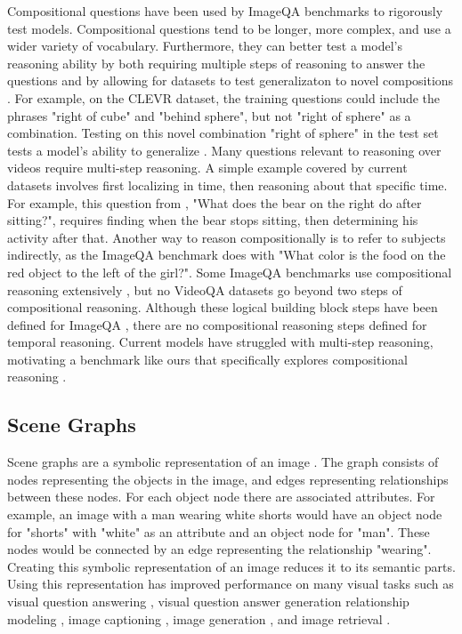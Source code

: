 \documentclass[10pt,twocolumn,letterpaper]{article}
\begin{document}
Compositional questions have been used by ImageQA benchmarks to rigorously test models. Compositional questions tend to be longer, more complex, and use a wider variety of vocabulary. Furthermore, they can better test a model's reasoning ability by both requiring multiple steps of reasoning to answer the questions and by allowing for datasets to test generalizaton to novel compositions \cite{johnson2017clevr, hudson2019gqa}. For example, on the CLEVR dataset, the training questions could include the phrases "right of cube" and "behind sphere", but not "right of sphere" as a combination. Testing on this novel combination "right of sphere" in the test set tests a model's ability to generalize \cite{lake2018generalization, johnson2017clevr}. Many questions relevant to reasoning over videos require multi-step reasoning. A simple example covered by current datasets involves first localizing in time, then reasoning about that specific time. For example, this question from \cite{jang2017tgif}, "What does the bear on the right do after sitting?", requires finding when the bear stops sitting, then determining his activity after that. Another way to reason compositionally is to refer to subjects indirectly, as the ImageQA benchmark \cite{hudson2019gqa} does with "What color is the food on the red object to the left of the girl?". Some ImageQA benchmarks use compositional reasoning extensively \cite{johnson2017clevr, hudson2019gqa}, but no VideoQA datasets go beyond two steps of compositional reasoning. Although these logical building block steps have been defined for ImageQA \cite{cheng2015break}, there are no compositional reasoning steps defined for temporal reasoning. Current models have struggled with multi-step reasoning, motivating a benchmark like ours that specifically explores compositional reasoning \cite{fan2019heterogeneous}.


\subsection{Scene Graphs}

Scene graphs are a symbolic representation of an image \cite{krishna2017visual}. The graph consists of nodes representing the objects in the image, and edges representing relationships between these nodes. For each object node there are associated attributes. For example, an image with a man wearing white shorts would have an object node for "shorts" with "white" as an attribute and an object node for "man". These nodes would be connected by an edge representing the relationship "wearing". Creating this symbolic representation of an image reduces it to its semantic parts. Using this representation has improved performance on many visual tasks such as visual question answering \cite{johnson2017inferring}, visual question answer generation \cite{hudson2019gqa} relationship modeling \cite{krishna2018referring}, image captioning \cite{anderson2016spice}, image generation \cite{johnson2018image, ashual2019specifying}, and image retrieval \cite{ashual2019specifying, johnson2015image}.
\end{document}
